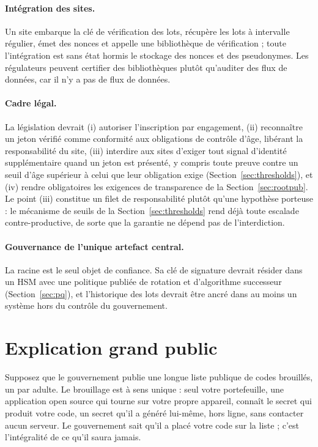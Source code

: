 \documentclass[11pt]{article}
\theoremstyle{definition}
\begin{document}
\paragraph{Intégration des sites.} Un site embarque la clé de vérification des lots,
récupère les lots à intervalle régulier, émet des nonces et appelle une bibliothèque de
vérification ; toute l'intégration est sans état hormis le stockage des nonces et des
pseudonymes. Les régulateurs peuvent certifier des bibliothèques plutôt qu'auditer des
flux de données, car il n'y a pas de flux de données.

\paragraph{Cadre légal.} La législation devrait (i) autoriser l'inscription par
engagement, (ii) reconnaître un jeton vérifié comme conformité aux obligations de contrôle
d'âge, libérant la responsabilité du site, (iii) interdire aux sites d'exiger tout signal
d'identité supplémentaire quand un jeton est présenté, y compris toute preuve contre un
seuil d'âge supérieur à celui que leur obligation exige (Section~\ref{sec:thresholds}), et
(iv) rendre obligatoires les exigences de transparence de la Section~\ref{sec:rootpub}. Le point (iii) constitue un
filet de responsabilité plutôt qu'une hypothèse porteuse : le mécanisme de seuils de la
Section~\ref{sec:thresholds} rend déjà toute escalade contre-productive, de sorte que la
garantie ne dépend pas de l'interdiction.

\paragraph{Gouvernance de l'unique artefact central.} La racine est le seul objet de
confiance. Sa clé de signature devrait résider dans un HSM avec une politique publiée de
rotation et d'algorithme successeur (Section~\ref{sec:pq}), et l'historique des lots
devrait être ancré dans au moins un système hors du contrôle du gouvernement.

\section{Explication grand public}

Supposez que le gouvernement publie une longue liste publique de codes brouillés, un par
adulte. Le
brouillage est à sens unique : seul votre portefeuille, une application open source qui
tourne sur votre propre appareil, connaît le secret qui produit votre code, un secret
qu'il a généré lui-même, hors ligne, sans contacter aucun serveur. Le gouvernement sait
qu'il a
placé votre code sur la liste ; c'est l'intégralité de ce qu'il saura jamais.
\end{document}
